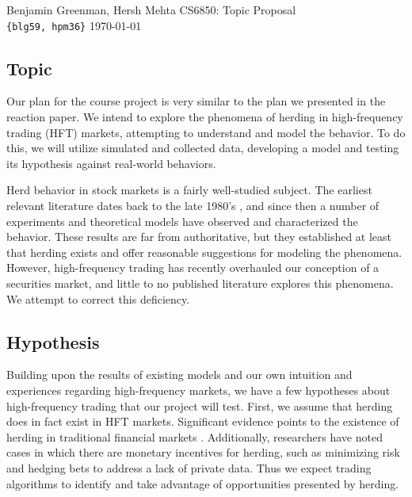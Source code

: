 \documentclass{article}
\renewcommand\maketitle{
\begin{flushleft}
{%
\large{%
Benjamin Greenman,
Hersh Mehta
\hfill
CS6850: Topic Proposal
\\\texttt{\{blg59, hpm36\}} \hfill \today
}}\\
\hrulefill
\end{flushleft}
}
\begin{document}
\maketitle


\subsection*{Topic}
Our plan for the course project is very similar to the plan we presented in the reaction paper. 
We intend to explore the phenomena of herding in high-frequency trading (HFT) markets, attempting to understand and model the behavior. 
To do this, we will utilize simulated and collected data, developing a model and testing its hypothesis against real-world behaviors. 

Herd behavior in stock markets is a fairly well-studied subject.
The earliest relevant literature dates back to the late 1980's \cite{bikhchandani}, and since then a number of experiments and theoretical models have observed and characterized the behavior.
These results are far from authoritative, but they established at least that herding exists and offer reasonable suggestions for modeling the phenomena.
However, high-frequency trading has recently overhauled our conception of a securities market, and little to no published literature explores this phenomena.
We attempt to correct this deficiency.

\subsection*{Hypothesis}
Building upon the results of existing models and our own intuition and experiences regarding high-frequency markets, we have a few hypotheses about high-frequency trading that our project will test.
First, we assume that herding does in fact exist in HFT markets.
Significant evidence points to the existence of herding in traditional financial markets \cite{scharfstein1990herd,grinblatt1995momentum,trueman1994analyst,devenow1996rational,golec1997herding,lin,lakonishok1992impact,sias2004institutional}.
Additionally, researchers have noted cases in which there are monetary incentives for herding, such as minimizing risk and hedging bets to address a lack of private data.
Thus we expect trading algorithms to identify and take advantage of opportunities presented by herding. 
\end{document}

